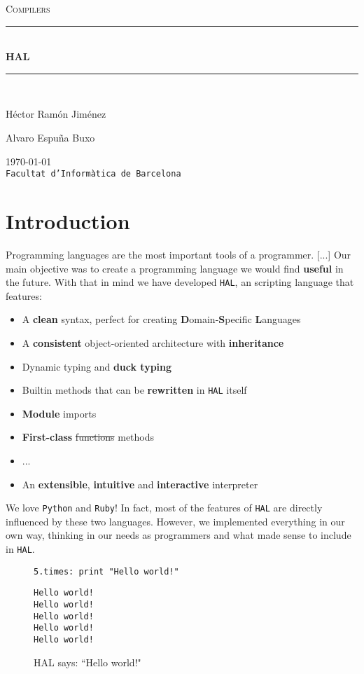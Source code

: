 \documentclass[a4paper,11pt]{article}
\begin{document}
\begin{titlepage}
\begin{center}
\textsc{\Large Compilers}
\\[1.5cm]
\rule{\linewidth}{0.5mm}
\\[0.4cm]
{\huge
\bfseries
HAL
\\[0.4cm]
}
\rule{\linewidth}{0.5mm}
\\[2.5cm]
\begin{minipage}{0.4\textwidth}
\begin{flushleft}
\large
Héctor Ramón Jiménez
\end{flushleft}
\end{minipage}
\begin{minipage}{0.4\textwidth}
\begin{flushright}
\large
Alvaro Espuña Buxo
\end{flushright}
\end{minipage}
\vfill
{\large
\today
}
\\
{\large
\texttt{Facultat d'Informàtica de Barcelona}
}
\end{center}
\end{titlepage}
\tableofcontents
\clearpage
\section{Introduction}
Programming languages are the most important tools of a programmer. [...]
Our main objective was to create a programming language we would find \textbf{useful} in the future.
  With that in mind we have developed \texttt{HAL}, an scripting language that features:
\begin{itemize}
\item
A \textbf{clean} syntax, perfect for creating \textbf{D}omain-\textbf{S}pecific \textbf{L}anguages
\item
A \textbf{consistent} object-oriented architecture with \textbf{inheritance}
\item
Dynamic typing and \textbf{duck typing}
\item
Builtin methods that can be \textbf{rewritten} in \texttt{HAL} itself
\item
\textbf{Module} imports
\item
\textbf{First-class} \st{functions} methods
\item
...
\item
An \textbf{extensible}, \textbf{intuitive} and \textbf{interactive} interpreter
\end{itemize}
We love \texttt{Python} and \texttt{Ruby}! In fact, most of the features of \texttt{HAL} are directly influenced
  by these two languages. However, we implemented everything in our own way, thinking in our
  needs as programmers and what made sense to include in \texttt{HAL}.
\begin{figure}[h!]
\begin{lstlisting}[language=hal]
5.times: print "Hello world!"
\end{lstlisting}
\begin{lstlisting}[language=output]
Hello world!
Hello world!
Hello world!
Hello world!
Hello world!
\end{lstlisting}
\caption{HAL says: ``Hello world!"}
\end{figure}
\clearpage
\end{document}
